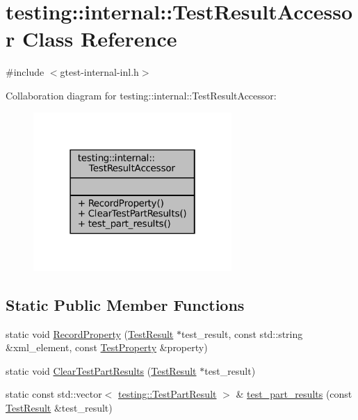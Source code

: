 \hypertarget{classtesting_1_1internal_1_1TestResultAccessor}{}\section{testing\+:\+:internal\+:\+:Test\+Result\+Accessor Class Reference}
\label{classtesting_1_1internal_1_1TestResultAccessor}


{\ttfamily \#include $<$gtest-\/internal-\/inl.\+h$>$}



Collaboration diagram for testing\+:\+:internal\+:\+:Test\+Result\+Accessor\+:
\nopagebreak
\begin{figure}[H]
\begin{center}
\leavevmode
\includegraphics[width=214pt]{classtesting_1_1internal_1_1TestResultAccessor__coll__graph}
\end{center}
\end{figure}
\subsection*{Static Public Member Functions}
\begin{DoxyCompactItemize}
\item 
static void \hyperlink{classtesting_1_1internal_1_1TestResultAccessor_abcc4b32d1b201eeef92f0ec0ae161cf9}{Record\+Property} (\hyperlink{classtesting_1_1TestResult}{Test\+Result} $\ast$test\+\_\+result, const std\+::string \&xml\+\_\+element, const \hyperlink{classtesting_1_1TestProperty}{Test\+Property} \&property)
\item 
static void \hyperlink{classtesting_1_1internal_1_1TestResultAccessor_a53c626632bac65d82d88e432072b866b}{Clear\+Test\+Part\+Results} (\hyperlink{classtesting_1_1TestResult}{Test\+Result} $\ast$test\+\_\+result)
\item 
static const std\+::vector$<$ \hyperlink{classtesting_1_1TestPartResult}{testing\+::\+Test\+Part\+Result} $>$ \& \hyperlink{classtesting_1_1internal_1_1TestResultAccessor_a55d771904317c1b0cc380104d175f1db}{test\+\_\+part\+\_\+results} (const \hyperlink{classtesting_1_1TestResult}{Test\+Result} \&test\+\_\+result)
\end{DoxyCompactItemize}


